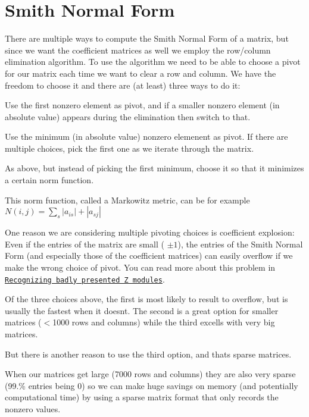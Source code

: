 \hypertarget{algo_smith}{}\section{Smith Normal Form}\label{algo_smith}
There are multiple ways to compute the Smith Normal Form of a matrix, but since we want the coefficient matrices as well we employ the row/column elimination algorithm. To use the algorithm we need to be able to choose a pivot for our matrix each time we want to clear a row and column. We have the freedom to choose it and there are (at least) three ways to do it\+:


\begin{DoxyItemize}
\item Use the first nonzero element as pivot, and if a smaller nonzero element (in absolute value) appears during the elimination then switch to that.
\item Use the minimum (in absolute value) nonzero elemenent as pivot. If there are multiple choices, pick the first one as we iterate through the matrix.
\item As above, but instead of picking the first minimum, choose it so that it minimizes a certain norm function.
\end{DoxyItemize}

This norm function, called a Markowitz metric, can be for example $N(i,j)=\sum_s|a_{is}|+|a_{sj}|$

One reason we are considering multiple pivoting choices is coefficient explosion\+: Even if the entries of the matrix are small ( $\pm 1$), the entries of the Smith Normal Form (and especially those of the coefficient matrices) can easily overflow if we make the wrong choice of pivot. You can read more about this problem in \href{https://arxiv.org/abs/math/9406205}{\tt Recognizing badly presented Z modules}.

Of the three choices above, the first is most likely to result to overflow, but is usually the fastest when it doesn\textquotesingle{}t. The second is a great option for smaller matrices ($<$1000 rows and columns) while the third excells with very big matrices.

But there is another reason to use the third option, and that\textquotesingle{}s sparse matrices.

When our matrices get large (7000 rows and columns) they are also very sparse (99.\% entries being 0) so we can make huge savings on memory (and potentially computational time) by using a sparse matrix format that only records the nonzero values.

